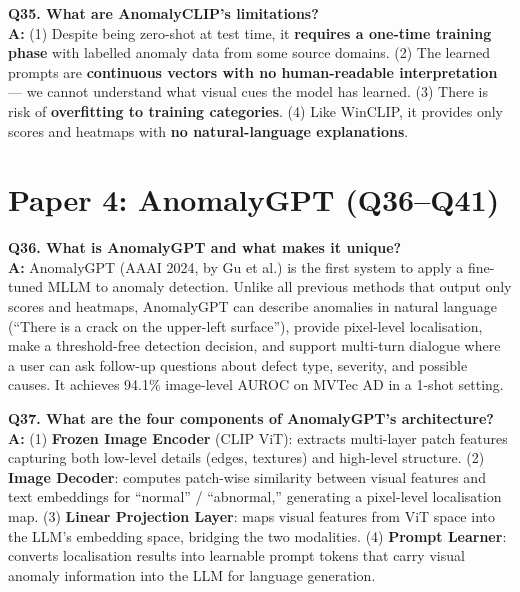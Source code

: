 \documentclass[12pt, a4paper]{article}
\begin{document}
\begin{qa}
\textbf{Q35. What are AnomalyCLIP's limitations?}\\[4pt]
\textbf{A:} (1) Despite being zero-shot at test time, it \textbf{requires a one-time training phase} with labelled anomaly data from some source domains. (2) The learned prompts are \textbf{continuous vectors with no human-readable interpretation} --- we cannot understand what visual cues the model has learned. (3) There is risk of \textbf{overfitting to training categories}. (4) Like WinCLIP, it provides only scores and heatmaps with \textbf{no natural-language explanations}.
\end{qa}

\section{Paper 4: AnomalyGPT (Q36--Q41)}

\begin{qa}
\textbf{Q36. What is AnomalyGPT and what makes it unique?}\\[4pt]
\textbf{A:} AnomalyGPT (AAAI 2024, by Gu et al.) is the first system to apply a fine-tuned MLLM to anomaly detection. Unlike all previous methods that output only scores and heatmaps, AnomalyGPT can describe anomalies in natural language (``There is a crack on the upper-left surface''), provide pixel-level localisation, make a threshold-free detection decision, and support multi-turn dialogue where a user can ask follow-up questions about defect type, severity, and possible causes. It achieves 94.1\% image-level AUROC on MVTec AD in a 1-shot setting.
\end{qa}

\begin{qa}
\textbf{Q37. What are the four components of AnomalyGPT's architecture?}\\[4pt]
\textbf{A:} (1) \textbf{Frozen Image Encoder} (CLIP ViT): extracts multi-layer patch features capturing both low-level details (edges, textures) and high-level structure. (2) \textbf{Image Decoder}: computes patch-wise similarity between visual features and text embeddings for ``normal'' / ``abnormal,'' generating a pixel-level localisation map. (3) \textbf{Linear Projection Layer}: maps visual features from ViT space into the LLM's embedding space, bridging the two modalities. (4) \textbf{Prompt Learner}: converts localisation results into learnable prompt tokens that carry visual anomaly information into the LLM for language generation.
\end{qa}
\end{document}

